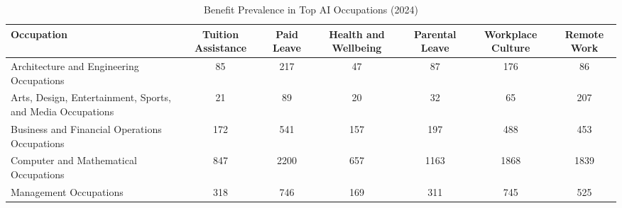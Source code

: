 \begin{table}[htbp]
\caption{Benefit Prevalence in Top AI Occupations (2024)}
\label{tab:benefits_top_ai_occs}
\begin{tabular}{lcccccc}
\hline\hline
Occupation & Tuition Assistance & Paid Leave & Health and Wellbeing & Parental Leave & Workplace Culture & Remote Work \\
\hline
Architecture and Engineering Occupations & 85 & 217 & 47 & 87 & 176 & 86 \\
Arts, Design, Entertainment, Sports, and Media Occupations & 21 & 89 & 20 & 32 & 65 & 207 \\
Business and Financial Operations Occupations & 172 & 541 & 157 & 197 & 488 & 453 \\
Computer and Mathematical Occupations & 847 & 2200 & 657 & 1163 & 1868 & 1839 \\
Management Occupations & 318 & 746 & 169 & 311 & 745 & 525 \\
\hline\hline
\end{tabular}
\end{table}
